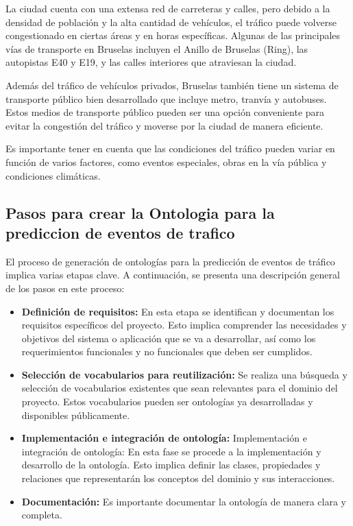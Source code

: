 \documentclass[12pt]{article}
\begin{document}
La ciudad cuenta con una extensa red de carreteras y calles, pero debido a la densidad de población y la alta cantidad de vehículos, el tráfico puede volverse congestionado en ciertas áreas y en horas específicas. Algunas de las principales vías de transporte en Bruselas incluyen el Anillo de Bruselas (Ring), las autopistas E40 y E19, y las calles interiores que atraviesan la ciudad.

Además del tráfico de vehículos privados, Bruselas también tiene un sistema de transporte público bien desarrollado que incluye metro, tranvía y autobuses. Estos medios de transporte público pueden ser una opción conveniente para evitar la congestión del tráfico y moverse por la ciudad de manera eficiente.

Es importante tener en cuenta que las condiciones del tráfico pueden variar en función de varios factores, como eventos especiales, obras en la vía pública y condiciones climáticas.

\subsection{Pasos para crear la Ontologia para la prediccion de eventos de trafico}

El proceso de generación de ontologías para la predicción de eventos de tráfico implica varias etapas clave. A continuación, se presenta una descripción general de los pasos en este proceso:

\begin{itemize}
    \item {
       
        \textbf{Definición de requisitos:} En esta etapa se identifican y documentan los requisitos específicos del proyecto. Esto implica comprender las necesidades y objetivos del sistema o aplicación que se va a desarrollar, así como los requerimientos funcionales y no funcionales que deben ser cumplidos.
    }
    \item {
    
        \textbf{Selección de vocabularios para reutilización:} Se realiza una búsqueda y selección de vocabularios existentes que sean relevantes para el dominio del proyecto. Estos vocabularios pueden ser ontologías ya desarrolladas y disponibles públicamente.    }
    
    
    \item {
    
        \textbf{Implementación e integración de ontología:} Implementación e integración de ontología: En esta fase se procede a la implementación y desarrollo de la ontología. Esto implica definir las clases, propiedades y relaciones que representarán los conceptos del dominio y sus interacciones.   }

    
    \item {
    
        \textbf{Documentación:} Es importante documentar la ontología de manera clara y completa.   }
    

\end{itemize}
\end{document}
